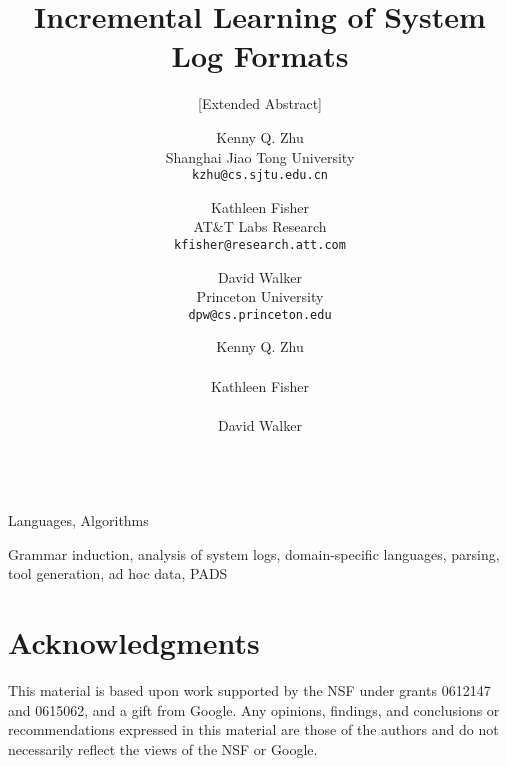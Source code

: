 \documentclass{acm_proc_article-sp}
\author{Kenny Q. Zhu \\
	   Shanghai Jiao Tong University\\
       {\small \tt kzhu@cs.sjtu.edu.cn}
	\and Kathleen Fisher \\
	   AT\&T Labs Research\\
       {\small \tt kfisher@research.att.com}
	\and David Walker \\
	   Princeton University\\
       {\small \tt dpw@cs.princeton.edu}}
\date{}
\begin{document}



\title{Incremental Learning of System Log Formats}
\subtitle{[Extended Abstract]}

\author{
\alignauthor
  Kenny Q. Zhu \\
   \\
\alignauthor
  Kathleen Fisher \\
   \\
\alignauthor
  David Walker \\
   \\
}

\maketitle




\terms
Languages, Algorithms

\keywords
Grammar induction, analysis of system logs, domain-specific languages, parsing,
tool generation, ad hoc data, PADS










\newpage



\section*{Acknowledgments}
This material is based upon work
 supported by the NSF under grants 0612147 and 0615062, and
a gift from Google. Any opinions, findings, and conclusions or recommendations
expressed in this material are those of the authors and do not
necessarily reflect the views of the NSF or Google.


%



%
\end{document}
